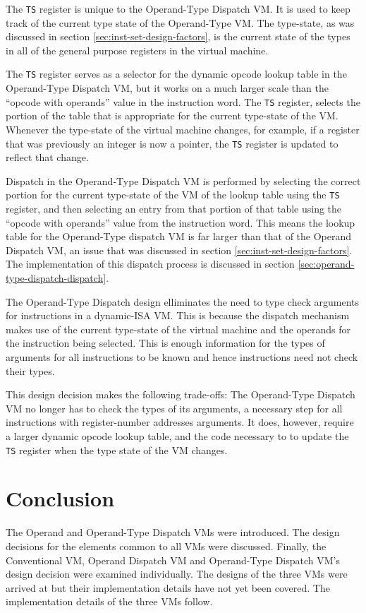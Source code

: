 \documentclass[english,a4paper,12pt]{report}
\begin{document}
The \verb|TS| register is unique to the Operand-Type Dispatch VM. It
is used to keep track of the current type state of the Operand-Type
VM. The type-state, as was discussed in section
\ref{sec:inst-set-design-factors}, is the current state of the types
in all of the general purpose registers in the virtual machine.

The \verb|TS| register serves as a selector for the dynamic opcode
lookup table in the Operand-Type Dispatch VM, but it works on a much
larger scale than the ``opcode with operands'' value in the
instruction word. The \verb|TS| register, selects the portion of the
table that is appropriate for the current type-state of the
VM. Whenever the type-state of the virtual machine changes, for
example, if a register that was previously an integer is now a
pointer, the \verb|TS| register is updated to reflect that change.

Dispatch in the Operand-Type Dispatch VM is performed by selecting the
correct portion for the current type-state of the VM of the lookup
table using the \verb|TS| register, and then selecting an entry from
that portion of that table using the ``opcode with operands'' value
from the instruction word. This means the lookup table for the
Operand-Type dispatch VM is far larger than that of the Operand
Dispatch VM, an issue that was discussed in section
\ref{sec:inst-set-design-factors}. The implementation of this dispatch
process is discussed in section
\ref{sec:operand-type-dispatch-dispatch}.

The Operand-Type Dispatch design elliminates the need to type check
arguments for instructions in a dynamic-ISA VM. This is because
the dispatch mechanism makes use of the current type-state of the
virtual machine and the operands for the instruction being
selected. This is enough information for the types of arguments for
all instructions to be known and hence instructions need not check
their types.

This design decision makes the following trade-offs: The Operand-Type
Dispatch VM no longer has to check the types of its arguments, a
necessary step for all instructions with register-number addresses
arguments. It does, however, require a larger dynamic opcode lookup
table, and the code necessary to to update the \verb|TS| register when
the type state of the VM changes. 

\section{Conclusion}
The Operand and Operand-Type Dispatch VMs were introduced. The design
decisions for the elements common to all VMs were discussed. Finally,
the Conventional VM, Operand Dispatch VM and Operand-Type Dispatch
VM's design decision were examined individually. The designs of the
three VMs were arrived at but their implementation details have not
yet been covered. The implementation details of the three VMs follow.
\end{document}

